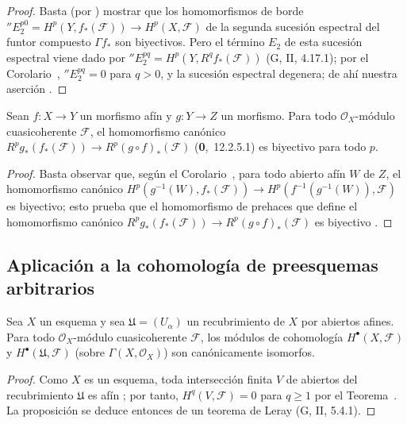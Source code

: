 \begin{proof}
Basta (por ) mostrar que los homomorfismos de borde $''E_2^{p0}=H^p(Y,f_*(\mathcal F))\to H^p(X,\mathcal F)$ de la segunda sucesión espectral del funtor compuesto $\Gamma f_*$ son biyectivos.
Pero el término $E_2$ de esta sucesión espectral viene dado por $''E_2^{pq}=H^p(Y,R^qf_*(\mathcal F))$ (G, II, 4.17.1); por el Corolario~, $''E_2^{pq}=0$ para $q>0$, y la sucesión espectral degenera; de ahí nuestra aserción .
\end{proof}

\begin{corollary}[1.3.4]
\label{III.1.3.4}
\label{III.1.3.4-fr}
Sean $f:X\to Y$ un morfismo afín y $g:Y\to Z$ un morfismo.
Para todo $\mathcal O_X$-módulo cuasicoherente $\mathcal F$, el homomorfismo canónico $R^pg_*(f_*(\mathcal F))\to R^p(g\circ f)_*(\mathcal F)$ \textup{(\textbf{0},~12.2.5.1)} es biyectivo para todo $p$.
\end{corollary}

\begin{proof}
Basta observar que, según el Corolario~, para todo abierto afín $W$ de $Z$, el homomorfismo canónico $H^p(g^{-1}(W),f_*(\mathcal F))\to
H^p(f^{-1}(g^{-1}(W)),\mathcal F)$ es biyectivo; esto prueba que el homomorfismo de prehaces que define el homomorfismo canónico $R^pg_*(f_*(\mathcal F))\to R^p(g\circ f)_*(\mathcal F)$ es biyectivo .
\end{proof}

\subsection{Aplicación a la cohomología de preesquemas arbitrarios}
\label{subsection:III.1.4}
\label{subsection:III.1.4-fr}

\begin{proposition}[1.4.1]
\label{III.1.4.1}
\label{III.1.4.1-fr}
Sea $X$ un esquema y sea $\mathfrak U=(U_\alpha)$ un recubrimiento de $X$ por abiertos afines.
Para todo $\mathcal O_X$-módulo cuasicoherente $\mathcal F$, los módulos de cohomología $H^\bullet(X,\mathcal F)$ y $H^\bullet(\mathfrak U,\mathcal F)$ (sobre $\Gamma(X,\mathcal O_X)$) son canónicamente isomorfos.
\end{proposition}

\begin{proof}
Como $X$ es un esquema, toda intersección finita $V$ de abiertos del recubrimiento $\mathfrak U$ es afín ; por tanto, $H^q(V,\mathcal F)=0$ para $q\geq1$ por el Teorema~.
La proposición se deduce entonces de un teorema de Leray (G, II, 5.4.1).
\end{proof}

